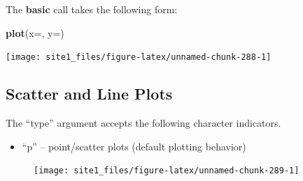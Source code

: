 \documentclass[]{book}
\newenvironment{Shaded}{\begin{snugshade}}{\end{snugshade}}
\newcommand{\KeywordTok}[1]{\textcolor[rgb]{0.13,0.29,0.53}{\textbf{#1}}}
\newcommand{\DataTypeTok}[1]{\textcolor[rgb]{0.13,0.29,0.53}{#1}}
\newcommand{\StringTok}[1]{\textcolor[rgb]{0.31,0.60,0.02}{#1}}
\newcommand{\OperatorTok}[1]{\textcolor[rgb]{0.81,0.36,0.00}{\textbf{#1}}}
\newcommand{\NormalTok}[1]{#1}
\providecommand{\tightlist}{%
  \setlength{\itemsep}{0pt}\setlength{\parskip}{0pt}}
\begin{document}
The \textbf{basic} call takes the following form:

\begin{Shaded}
\begin{Highlighting}[]
\KeywordTok{plot}\NormalTok{(}\DataTypeTok{x=}\NormalTok{, }\DataTypeTok{y=}\NormalTok{)}
\end{Highlighting}
\end{Shaded}

\begin{Shaded}
\end{Shaded}

\begin{center}\texttt{[image: site1\_files/figure-latex/unnamed-chunk-288-1]} \end{center}

\subsection{Scatter and Line Plots}\label{scatter-and-line-plots}

The ``type'' argument accepts the following character indicators.

\begin{itemize}
\tightlist
\item
  ``p'' -- point/scatter plots (default plotting behavior)
\end{itemize}

\begin{Shaded}
\end{Shaded}

\begin{figure}

{\centering \texttt{[image: site1\_files/figure-latex/unnamed-chunk-289-1]} 

}

\caption{ }\label{fig:unnamed-chunk-289}
\end{figure}
\end{document}
